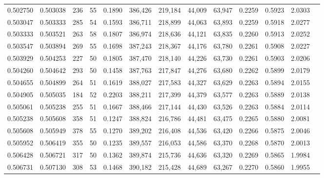 \begin{tabular}{rrrrrrrrrrrrr}
0.502750 & 0.503038 &    236 &    55 &                                     0.1890 & 386,426 & 219,184 &  44,009 &  63,947 & 0.2259 & 0.5923 & 2.0303 \\
0.503047 & 0.503333 &    285 &    54 &                                     0.1593 & 386,711 & 218,899 &  44,063 &  63,893 & 0.2259 & 0.5918 & 2.0277 \\
0.503333 & 0.503521 &    263 &    58 &                                     0.1807 & 386,974 & 218,636 &  44,121 &  63,835 & 0.2260 & 0.5913 & 2.0252 \\
0.503547 & 0.503894 &    269 &    55 &                                     0.1698 & 387,243 & 218,367 &  44,176 &  63,780 & 0.2261 & 0.5908 & 2.0227 \\
0.503929 & 0.504253 &    227 &    50 &                                     0.1805 & 387,470 & 218,140 &  44,226 &  63,730 & 0.2261 & 0.5903 & 2.0206 \\
0.504260 & 0.504642 &    293 &    50 &                                     0.1458 & 387,763 & 217,847 &  44,276 &  63,680 & 0.2262 & 0.5899 & 2.0179 \\
0.504655 & 0.504899 &    264 &    51 &                                     0.1619 & 388,027 & 217,583 &  44,327 &  63,629 & 0.2263 & 0.5894 & 2.0155 \\
0.504905 & 0.505035 &    184 &    52 &                                     0.2203 & 388,211 & 217,399 &  44,379 &  63,577 & 0.2263 & 0.5889 & 2.0138 \\
0.505061 & 0.505238 &    255 &    51 &                                     0.1667 & 388,466 & 217,144 &  44,430 &  63,526 & 0.2263 & 0.5884 & 2.0114 \\
0.505238 & 0.505608 &    358 &    51 &                                     0.1247 & 388,824 & 216,786 &  44,481 &  63,475 & 0.2265 & 0.5880 & 2.0081 \\
0.505608 & 0.505949 &    378 &    55 &                                     0.1270 & 389,202 & 216,408 &  44,536 &  63,420 & 0.2266 & 0.5875 & 2.0046 \\
0.505952 & 0.506419 &    355 &    50 &                                     0.1235 & 389,557 & 216,053 &  44,586 &  63,370 & 0.2268 & 0.5870 & 2.0013 \\
0.506428 & 0.506721 &    317 &    50 &                                     0.1362 & 389,874 & 215,736 &  44,636 &  63,320 & 0.2269 & 0.5865 & 1.9984 \\
0.506731 & 0.507130 &    308 &    53 &                                     0.1468 & 390,182 & 215,428 &  44,689 &  63,267 & 0.2270 & 0.5860 & 1.9955 \\

\end{tabular}

